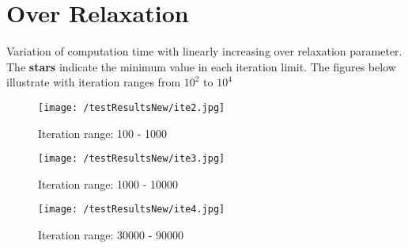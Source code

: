 \documentclass[11pt]{article}
\begin{document}
\section*{Over Relaxation}
Variation of computation time with linearly increasing over relaxation parameter. The \textbf{stars} indicate the minimum value in each iteration limit. The figures below illustrate with iteration ranges from $10^2$ to $10^4$ 
\begin{figure}[htb]
  \begin{center}
	 \texttt{[image: /testResultsNew/ite2.jpg]}
	 \caption{Iteration range: 100 - 1000}
	 \label{fig:ite2}
  \end{center}
\end{figure}
\begin{figure}[htb]
  \begin{center}
	 \texttt{[image: /testResultsNew/ite3.jpg]}
	 \caption{Iteration range: 1000 - 10000}
	 \label{fig:ite3}
  \end{center}
\end{figure}
\begin{figure}[htb]
  \begin{center}
	 \texttt{[image: /testResultsNew/ite4.jpg]}
	 \caption{Iteration range: 30000 - 90000}
	 \label{fig:ite4}
  \end{center}
\end{figure}
\end{document}
